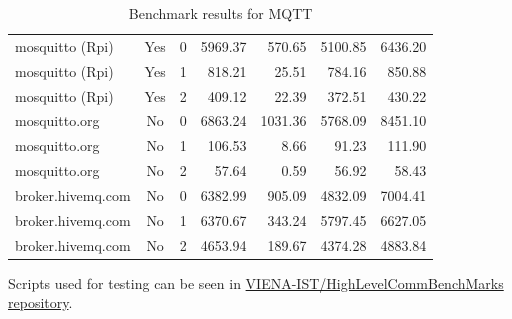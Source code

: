 \begin{table}
\begin{tabular}{lccrrrr}
		\midrule
		mosquitto (Rpi)   & Yes     &0    & 5969.37           &570.65  &5100.85   &6436.20   \\
		mosquitto (Rpi)   & Yes     &1    & 818.21            &25.51   &784.16    &850.88    \\
		mosquitto (Rpi)   & Yes     &2    & 409.12            &22.39   &372.51    &430.22    \\
		\midrule
		mosquitto.org     & No      &0    & 6863.24           &1031.36 &5768.09   &8451.10   \\
		mosquitto.org     & No      &1    & 106.53            & 8.66   &  91.23   & 111.90   \\
		mosquitto.org     & No      &2    & 57.64             & 0.59   &  56.92   & 58.43    \\
		\midrule
		broker.hivemq.com & No      &0    & 6382.99           &905.09  & 4832.09  & 7004.41  \\
		broker.hivemq.com & No      &1    & 6370.67           &343.24  & 5797.45  & 6627.05  \\
		broker.hivemq.com & No      &2    & 4653.94           &189.67  & 4374.28  & 4883.84  \\
		\bottomrule
	\end{tabular}
	\caption{Benchmark results for MQTT}
	\label{tab:mqtt_results}
\end{table}

Scripts used for testing can be seen in \href{https://github.com/VIENA-IST/HighLevelCommBenchMarks}{VIENA-IST/HighLevelCommBenchMarks repository}.

